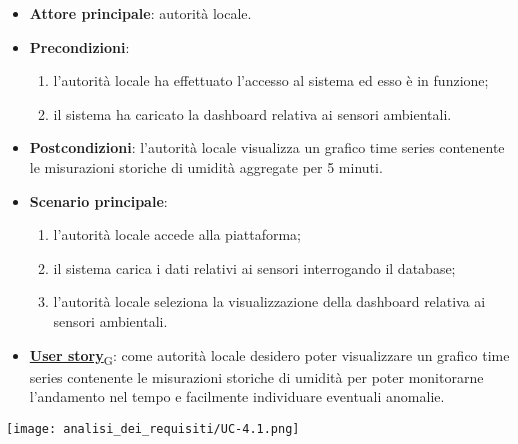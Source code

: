 \begin{itemize}
	\item \textbf{Attore principale}: autorità locale.
	\item \textbf{Precondizioni}:
	      \begin{enumerate}
		      \item l'autorità locale ha effettuato l'accesso al sistema ed esso è in funzione;
		      \item il sistema ha caricato la dashboard relativa ai sensori ambientali.
	      \end{enumerate}
	\item \textbf{Postcondizioni}: l'autorità locale visualizza un grafico time series contenente le misurazioni storiche di umidità aggregate per 5 minuti.
	\item \textbf{Scenario principale}:
	      \begin{enumerate}
		      \item l'autorità locale accede alla piattaforma;
		      \item il sistema carica i dati relativi ai sensori interrogando il database;
		      \item l'autorità locale seleziona la visualizzazione della dashboard relativa ai sensori ambientali.
	      \end{enumerate}
	\item \href{https://7last.github.io/docs/pb/documentazione-interna/glossario\#user-story}{\textbf{User story}\textsubscript{G}}:
	      come autorità locale desidero poter visualizzare un grafico time series contenente le misurazioni storiche
	      di umidità per poter monitorarne l'andamento nel tempo e facilmente individuare eventuali anomalie.
\end{itemize}
\begin{center}
	\texttt{[image: analisi\_dei\_requisiti/UC-4.1.png]}
\end{center}


